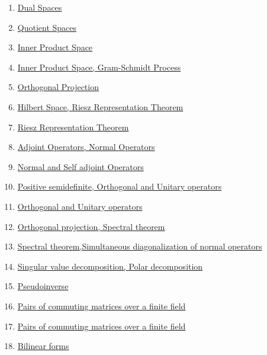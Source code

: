 \documentclass[11pt]{article}
\begin{document}
\begin{enumerate}
	\item	\href{https://mp.weixin.qq.com/s/8_QST5dxEKyB12G8_ktWTA}{Dual Spaces}	%
	\item	\href{https://mp.weixin.qq.com/s/gAa02J40CunOB3BlMbKapw}{Quotient Spaces}	%
	\item	\href{https://mp.weixin.qq.com/s/ZmE4fEIbW6LF3HZardqsRw}{Inner Product Space} 	%
	\item 	\href{https://mp.weixin.qq.com/s/EKLaF5VZQv7cFt8xFVH1Ug}{Inner Product Space, Gram-Schmidt Process}	%
	\item 	\href{https://mp.weixin.qq.com/s/NPpOiA4IRjAyNV6zsy-Y7A}{Orthogonal Projection}	%
	\item 	\href{https://mp.weixin.qq.com/s/EDz_x0WwnAsAsM5ukfjO3g}{Hilbert Space, Riesz Representation Theorem}	%
	\item 	\href{https://mp.weixin.qq.com/s/t6MwSXt-qy93ETmyH0N8SA}{Riesz Representation Theorem}	%
	\item 	\href{https://mp.weixin.qq.com/s/GUr4P5YMjudFjeMGji2Mjg}{Adjoint Operators, Normal Operators}	%
	\item 	\href{https://mp.weixin.qq.com/s/Rh8Iagwk4wH_pvWDUeUYdg}{Normal and Self adjoint Operators}	%
	\item 	\href{https://mp.weixin.qq.com/s/5QN9TF3BrQ_nKx6axTjlWA}{Positive semidefinite, Orthogonal and Unitary operators}	%
	\item	\href{https://mp.weixin.qq.com/s/OA3bwnAY_arYV-ajX4ql0w}{Orthogonal and Unitary operators}	%
	\item	\href{https://mp.weixin.qq.com/s/TCGb2yYOOK9tqtmZCWVTqA}{Orthogonal projection, Spectral theorem}	%
	\item	\href{https://mp.weixin.qq.com/s/XNiZAj-cxD8BJ-pE_lFnXg}{Spectral theorem,Simultaneous diagonalization of normal operators} 	%
	\item 	\href{https://mp.weixin.qq.com/s/vM5cpAKGGx90gVzSvlnlTw}{Singular value decomposition, Polar decomposition}	%
	\item 	\href{https://mp.weixin.qq.com/s/SpFaZhE88kLGFdv4hUowRQ}{Pseudoinverse}	%
	\item 	\href{https://mp.weixin.qq.com/s/WK4y7Y07Zw0Qa0oJmdrvFA}{Pairs of commuting matrices over a finite field}	%
	\item 	\href{https://mp.weixin.qq.com/s/-CRx4gE2cgbhRpf0xtKSpQ}{Pairs of commuting matrices over a finite field}	%
	\item 	\href{https://mp.weixin.qq.com/s/dUJwCQWXaj6tmjcO1c2X3w}{Bilinear forms}	%

\end{enumerate}
\end{document}
